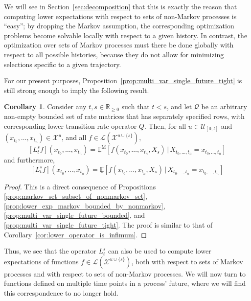 \documentclass[10pt]{paper}
\theoremstyle{definition}
\newtheorem{proposition}[theorem]{Proposition}
\newtheorem{corollary}[theorem]{Corollary}
\newcommand{\reals}{\mathbb{R}}
\newcommand{\realspos}{\reals_{>0}}
\newcommand{\realsnonneg}{\reals_{\geq 0}}
\newcommand{\states}{\mathcal{X}}
\newcommand{\processes}{\mathbb{P}}
\newcommand{\mprocesses}{\processes^{\mathrm{M}}}
\newcommand{\gambles}{\mathcal{L}}
\newcommand{\rateset}{\mathcal{Q}}
\newcommand{\lrate}{\underline{Q}}
\newcommand{\norm}[1]{\left\lVert #1 \right\rVert}
\begin{document}
We will see in Section~\ref{sec:decomposition} that this is exactly the reason that computing lower expectations with respect to sets of non-Markov processes is ``easy''; by dropping the Markov assumption, the corresponding optimization problems become solvable locally with respect to a given history. In contrast, the optimization over sets of Markov processes must there be done globally with respect to all possible histories, because they do not allow for minimizing selections specific to a given trajectory.

For our present purposes, Proposition~\ref{prop:multi_var_single_future_tight} is still strong enough to imply the following result.


\begin{corollary}
Consider any $t,s\in\realsnonneg$ such that $t<s$, and let $\rateset$ be an arbitrary non-empty bounded set of rate matrices that has separately specified rows, with corresponding lower transition rate operator $\lrate$. Then, for all $u\in\mathcal{U}_{[0,t]}$ and $(x_{t_0},\ldots,x_{t_n})\in\states^u$, and all $f\in\gambles(\states^{u\cup\{s\}})$,
\begin{equation*}
\left[L_t^s f\right](x_{t_0},\ldots,x_{t_n}) = \underline{\mathbb{E}}^{\mathrm{M}}[f(x_{t_0},\ldots,x_{t_n},X_s)\,\vert\,X_{t_0,\ldots,t_n}=x_{t_0,\ldots,t_n}]
\end{equation*}
and furthermore,
\begin{equation*}
\left[L_t^s f\right](x_{t_0},\ldots,x_{t_n}) = \underline{\mathbb{E}}[f(x_{t_0},\ldots,x_{t_n},X_s)\,\vert\,X_{t_0,\ldots,t_n}=x_{t_0,\ldots,t_n}]
\end{equation*}
\end{corollary}
\begin{proof}
This is a direct consequence of Propositions \ref{prop:markov_set_subset_of_nonmarkov_set}, \ref{prop:lower_exp_markov_bounded_by_nonmarkov}, \ref{prop:multi_var_single_future_bounded}, and \ref{prop:multi_var_single_future_tight}. The proof is similar to that of Corollary~\ref{cor:lower_operator_is_infimum}.
\end{proof}
Thus, we see that the operator $L_t^s$ can also be used to compute lower expectations of functions $f\in\gambles(\states^{u\cup\{s\}})$, both with respect to sets of Markov processes and with respect to sets of non-Markov processes. We will now turn to functions defined on multiple time points in a process' future, where we will find this correspondence to no longer hold.
\end{document}
